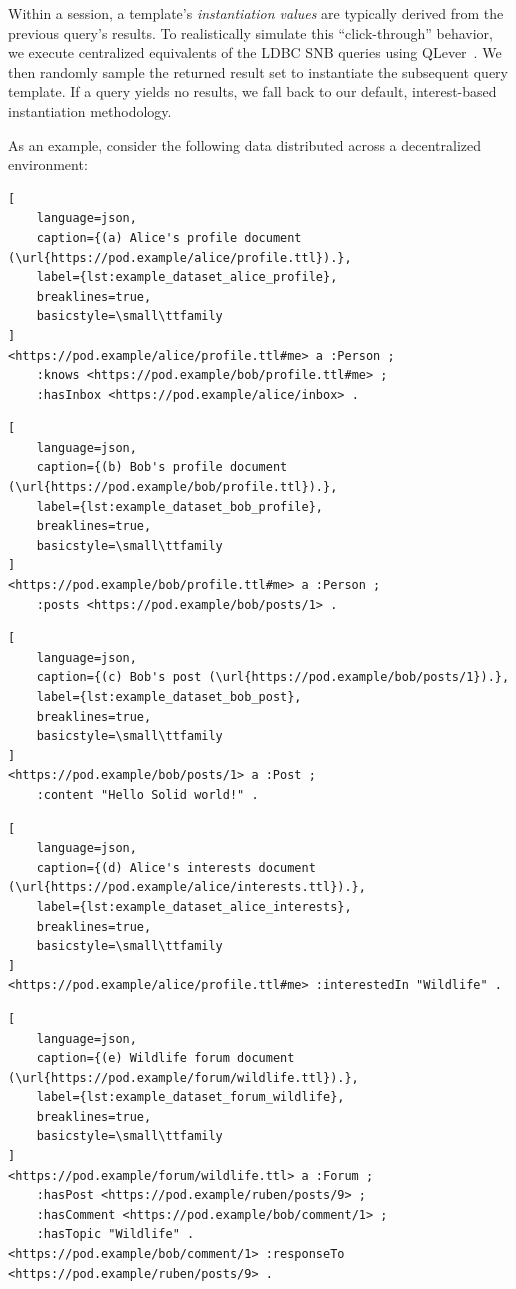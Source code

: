 Within a session, a template's \emph{instantiation values} are typically derived 
from the previous query's results. 
To realistically simulate this ``click-through'' 
behavior, we execute centralized equivalents of the LDBC SNB queries using 
QLever~\cite{bast2017qlever}. 
We then randomly sample the returned result set 
to instantiate the subsequent query template. 
If a query yields no results, 
we fall back to our default, interest-based instantiation methodology.

As an example, consider the following data distributed across a 
decentralized environment:

\begin{lstlisting}[
    language=json,
    caption={(a) Alice's profile document (\url{https://pod.example/alice/profile.ttl}).},
    label={lst:example_dataset_alice_profile},
    breaklines=true,
    basicstyle=\small\ttfamily
]
<https://pod.example/alice/profile.ttl#me> a :Person ;
    :knows <https://pod.example/bob/profile.ttl#me> ;
    :hasInbox <https://pod.example/alice/inbox> .
\end{lstlisting}
\continuelisting

\begin{lstlisting}[
    language=json,
    caption={(b) Bob's profile document (\url{https://pod.example/bob/profile.ttl}).},
    label={lst:example_dataset_bob_profile},
    breaklines=true,
    basicstyle=\small\ttfamily
]
<https://pod.example/bob/profile.ttl#me> a :Person ;
    :posts <https://pod.example/bob/posts/1> .
\end{lstlisting}
\continuelisting

\begin{lstlisting}[
    language=json,
    caption={(c) Bob's post (\url{https://pod.example/bob/posts/1}).},
    label={lst:example_dataset_bob_post},
    breaklines=true,
    basicstyle=\small\ttfamily
]
<https://pod.example/bob/posts/1> a :Post ;
    :content "Hello Solid world!" .
\end{lstlisting}
\continuelisting

\begin{lstlisting}[
    language=json,
    caption={(d) Alice's interests document (\url{https://pod.example/alice/interests.ttl}).},
    label={lst:example_dataset_alice_interests},
    breaklines=true,
    basicstyle=\small\ttfamily
]
<https://pod.example/alice/profile.ttl#me> :interestedIn "Wildlife" .
\end{lstlisting}
\continuelisting

\begin{lstlisting}[
    language=json,
    caption={(e) Wildlife forum document (\url{https://pod.example/forum/wildlife.ttl}).},
    label={lst:example_dataset_forum_wildlife},
    breaklines=true,
    basicstyle=\small\ttfamily
]
<https://pod.example/forum/wildlife.ttl> a :Forum ;
    :hasPost <https://pod.example/ruben/posts/9> ;
    :hasComment <https://pod.example/bob/comment/1> ;
    :hasTopic "Wildlife" .
<https://pod.example/bob/comment/1> :responseTo <https://pod.example/ruben/posts/9> .
\end{lstlisting}


